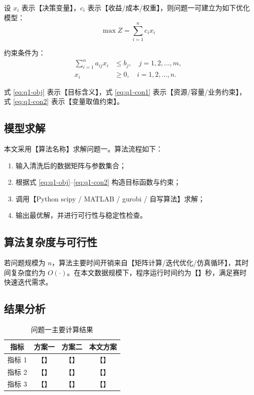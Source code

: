 \documentclass{cumcmthesis}
\begin{document}
设 $x_i$ 表示【决策变量】，$c_i$ 表示【收益/成本/权重】，则问题一可建立为如下优化模型：
\begin{equation}
  \max Z = \sum_{i=1}^{n} c_i x_i
  \label{eq:q1-obj}
\end{equation}

约束条件为：
\begin{align}
  \sum_{i=1}^{n} a_{ij}x_i &\le b_j,\quad j=1,2,\ldots,m, \label{eq:q1-con1}\\
  x_i &\ge 0,\quad i=1,2,\ldots,n. \label{eq:q1-con2}
\end{align}

式 \eqref{eq:q1-obj} 表示【目标含义】，式 \eqref{eq:q1-con1} 表示【资源/容量/业务约束】，式 \eqref{eq:q1-con2} 表示【变量取值约束】。

\subsection{模型求解}
本文采用【算法名称】求解问题一。算法流程如下：
\begin{enumerate}
  \item 输入清洗后的数据矩阵与参数集合；
  \item 根据式 \eqref{eq:q1-obj}--\eqref{eq:q1-con2} 构造目标函数与约束；
  \item 调用【Python scipy / MATLAB / gurobi / 自写算法】求解；
  \item 输出最优解，并进行可行性与稳定性检查。
\end{enumerate}

\subsection{算法复杂度与可行性}
若问题规模为 $n$，算法主要时间开销来自【矩阵计算/迭代优化/仿真循环】，其时间复杂度约为 $O(\cdot)$。在本文数据规模下，程序运行时间约为【】秒，满足赛时快速迭代需求。

\subsection{结果分析}

\begin{table}[H]
  \centering
  \caption{问题一主要计算结果}
  \label{tab:q1-result}
  \begin{tabular}{cccc}
    \toprule
    指标 & 方案一 & 方案二 & 本文方案 \\
    \midrule
    指标 1 & 【】 & 【】 & 【】 \\
    指标 2 & 【】 & 【】 & 【】 \\
    指标 3 & 【】 & 【】 & 【】 \\
    \bottomrule
  \end{tabular}
\end{table}
\end{document}
